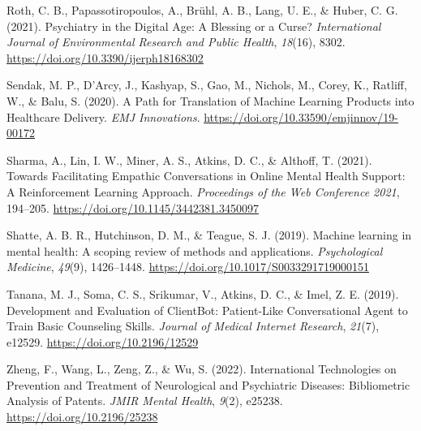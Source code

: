\documentclass[
  man]{apa7}
\newlength{\cslhangindent}
\newlength{\cslentryspacingunit} %
\newenvironment{CSLReferences}[2] %
 {%
  \setlength{\parindent}{0pt}
  \ifodd #1
  \let\oldpar\par
  \def\par{\hangindent=\cslhangindent\oldpar}
  \fi
  \setlength{\parskip}{#2\cslentryspacingunit}
 }%
 {}
\begin{document}
\begin{CSLReferences}{1}{0}
\leavevmode{}%
Roth, C. B., Papassotiropoulos, A., Brühl, A. B., Lang, U. E., \& Huber, C. G. (2021). Psychiatry in the {Digital} {Age}: {A} {Blessing} or a {Curse}? \emph{International Journal of Environmental Research and Public Health}, \emph{18}(16), 8302. \url{https://doi.org/10.3390/ijerph18168302}

\leavevmode{}%
Sendak, M. P., D'Arcy, J., Kashyap, S., Gao, M., Nichols, M., Corey, K., Ratliff, W., \& Balu, S. (2020). A {Path} for {Translation} of {Machine} {Learning} {Products} into {Healthcare} {Delivery}. \emph{EMJ Innovations}. \url{https://doi.org/10.33590/emjinnov/19-00172}

\leavevmode{}%
Sharma, A., Lin, I. W., Miner, A. S., Atkins, D. C., \& Althoff, T. (2021). Towards {Facilitating} {Empathic} {Conversations} in {Online} {Mental} {Health} {Support}: {A} {Reinforcement} {Learning} {Approach}. \emph{Proceedings of the {Web} {Conference} 2021}, 194--205. \url{https://doi.org/10.1145/3442381.3450097}

\leavevmode{}%
Shatte, A. B. R., Hutchinson, D. M., \& Teague, S. J. (2019). Machine learning in mental health: A scoping review of methods and applications. \emph{Psychological Medicine}, \emph{49}(9), 1426--1448. \url{https://doi.org/10.1017/S0033291719000151}

\leavevmode{}%
Tanana, M. J., Soma, C. S., Srikumar, V., Atkins, D. C., \& Imel, Z. E. (2019). Development and {Evaluation} of {ClientBot}: {Patient}-{Like} {Conversational} {Agent} to {Train} {Basic} {Counseling} {Skills}. \emph{Journal of Medical Internet Research}, \emph{21}(7), e12529. \url{https://doi.org/10.2196/12529}

\leavevmode{}%
Zheng, F., Wang, L., Zeng, Z., \& Wu, S. (2022). International {Technologies} on {Prevention} and {Treatment} of {Neurological} and {Psychiatric} {Diseases}: {Bibliometric} {Analysis} of {Patents}. \emph{JMIR Mental Health}, \emph{9}(2), e25238. \url{https://doi.org/10.2196/25238}

\end{CSLReferences}
\end{document}
